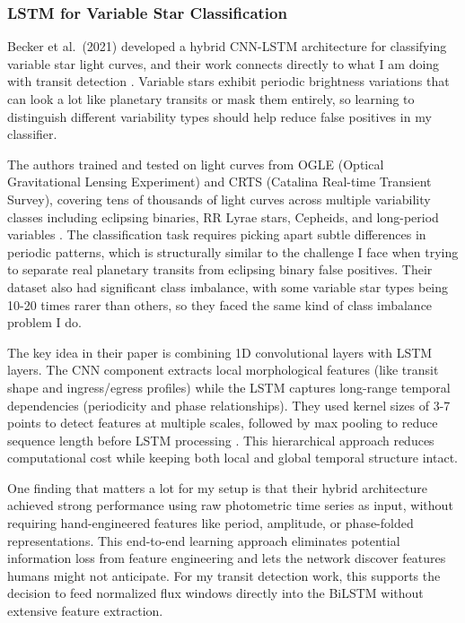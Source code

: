\documentclass[letterpaper]{article} %
\begin{document}
\subsubsection{LSTM for Variable Star Classification}
Becker et al.\ (2021) developed a hybrid CNN-LSTM architecture for classifying variable star light curves, and their work connects directly to what I am doing with transit detection \cite{Becker2021variablestars}. Variable stars exhibit periodic brightness variations that can look a lot like planetary transits or mask them entirely, so learning to distinguish different variability types should help reduce false positives in my classifier.

The authors trained and tested on light curves from OGLE (Optical Gravitational Lensing Experiment) and CRTS (Catalina Real-time Transient Survey), covering tens of thousands of light curves across multiple variability classes including eclipsing binaries, RR Lyrae stars, Cepheids, and long-period variables \cite{Becker2021variablestars}. The classification task requires picking apart subtle differences in periodic patterns, which is structurally similar to the challenge I face when trying to separate real planetary transits from eclipsing binary false positives. Their dataset also had significant class imbalance, with some variable star types being 10-20 times rarer than others, so they faced the same kind of class imbalance problem I do.

The key idea in their paper is combining 1D convolutional layers with LSTM layers. The CNN component extracts local morphological features (like transit shape and ingress/egress profiles) while the LSTM captures long-range temporal dependencies (periodicity and phase relationships). They used kernel sizes of 3-7 points to detect features at multiple scales, followed by max pooling to reduce sequence length before LSTM processing \cite{Becker2021variablestars}. This hierarchical approach reduces computational cost while keeping both local and global temporal structure intact.

One finding that matters a lot for my setup is that their hybrid architecture achieved strong performance using raw photometric time series as input, without requiring hand-engineered features like period, amplitude, or phase-folded representations. This end-to-end learning approach eliminates potential information loss from feature engineering and lets the network discover features humans might not anticipate. For my transit detection work, this supports the decision to feed normalized flux windows directly into the BiLSTM without extensive feature extraction.
\end{document}
